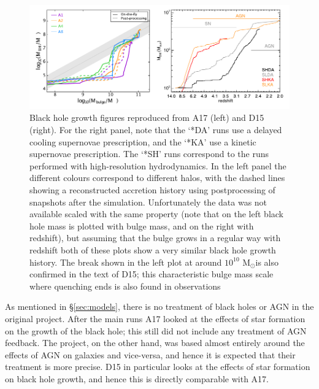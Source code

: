 \begin{figure}[!h]
  \includegraphics[width=\textwidth]{figures/comparisonfig.pdf}
    \caption{Black hole growth figures reproduced from A17 (left) and D15
    (right). For the right panel, note that the `*DA' runs use a delayed
    cooling supernovae prescription, and the `*KA' use a kinetic supernovae
    prescription. The `*SH' runs correspond to the runs performed with
    high-resolution hydrodynamics. In the left panel the different colours
    correspond to different halos, with the dashed lines showing a
    reconstructed accretion history using postprocessing of snapshots after the
    simulation. Unfortunately the data was not available scaled with the same
    property (note that on the left black hole mass is plotted with bulge mass,
    and on the right with redshift), but assuming that the bulge grows in a
    regular way with redshift both of these plots show a very similar black
    hole growth history. The break shown in the left plot at around $10^10$
    M$_\odot$is also confirmed in the text of D15; this characteristic bulge
    mass scale where quenching ends is also found in observations \citep[see
    e.g.][]{greene_precise_2010, graham_black_2015}}
  \label{fig:bhhistory}
\end{figure}
As mentioned in §\ref{sec:models}, there is no treatment of black holes or AGN
in the original \fire{} project. After the main runs A17 looked at the effects
of star formation on the growth of the black hole; this still did not include
any treatment of AGN feedback. The \hagn{} project, on the other hand, was
based almost entirely around the effects of AGN on galaxies and vice-versa, and
hence it is expected that their treatment is more precise.  D15 in particular
looks at the effects of star formation on black hole growth, and hence this is
directly comparable with A17.

